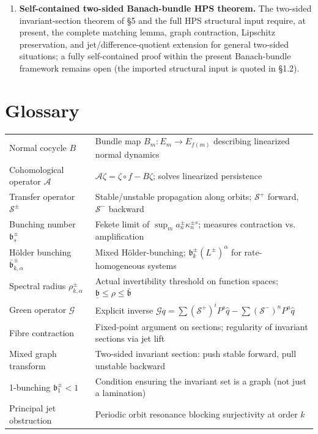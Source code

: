 \documentclass[11pt,a4paper]{article}
\theoremstyle{plain}
\theoremstyle{definition}
\theoremstyle{remark}
\numberwithin{equation}{section}
\numberwithin{figure}{section}
\begin{document}
\begin{enumerate}
    \item \textbf{Self-contained two-sided Banach-bundle HPS theorem.} The two-sided invariant-section theorem of §5 and the full HPS structural input require, at present, the complete matching lemma, graph contraction, Lipschitz preservation, and jet/difference-quotient extension for general two-sided situations; a fully self-contained proof within the present Banach-bundle framework remains open (the imported structural input is quoted in §1.2).
\end{enumerate}

\section*{Glossary}

\begin{tabular}{l|l}
Normal cocycle $B$ & Bundle map $B_m:E_m\to E_{f(m)}$ describing linearized normal dynamics \\
Cohomological operator $\mathcal A$ & $\mathcal A\zeta = \zeta\circ f - B\zeta$; solves linearized persistence \\
Transfer operator $\mathcal S^\pm$ & Stable/unstable propagation along orbits; $\mathcal S^+$ forward, $\mathcal S^-$ backward \\
Bunching number $\mathfrak b^\pm_s$ & Fekete limit of $\sup_m a_n^\pm \kappa_n^{\pm s}$; measures contraction vs. amplification \\
Hölder bunching $\bar{\mathfrak b}^\pm_{k,\alpha}$ & Mixed Hölder-bunching; $\mathfrak b^\pm_k(L^\pm)^\alpha$ for rate-homogeneous systems \\
Spectral radius $\rho^\pm_{k,\alpha}$ & Actual invertibility threshold on function spaces; $\underline{\mathfrak b}\le\rho\le\bar{\mathfrak b}$ \\
Green operator $\mathcal G$ & Explicit inverse $\mathcal Gq=\sum(\mathcal S^+)^iP^s\hat q-\sum(\mathcal S^-)^nP^u\hat q$ \\
Fibre contraction & Fixed-point argument on sections; regularity of invariant sections via jet lift \\
Mixed graph transform & Two-sided invariant section: push stable forward, pull unstable backward \\
1-bunching $\mathfrak b_1^\pm<1$ & Condition ensuring the invariant set is a graph (not just a lamination) \\
Principal jet obstruction & Periodic orbit resonance blocking surjectivity at order $k$ \\
\end{tabular}
\end{document}
